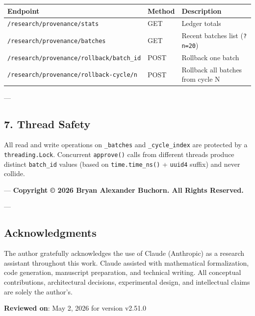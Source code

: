 \begin{center}
{\footnotesize
\begin{tabularx}{\columnwidth}{|>{\raggedright\arraybackslash}X|>{\raggedright\arraybackslash}X|>{\raggedright\arraybackslash}X|}
\hline
Endpoint & Method & Description \\ \hline
\texttt{/research/provenance/stats} & GET & Ledger totals \\ \hline
\texttt{/research/provenance/batches} & GET & Recent batches list (\texttt{?n=20}) \\ \hline
\texttt{/research/provenance/rollback/{batch\_id}} & POST & Rollback one batch \\ \hline
\texttt{/research/provenance/rollback-cycle/{n}} & POST & Rollback all batches from cycle N \\ \hline
\end{tabularx}
}
\end{center}

---

\subsection{7. Thread Safety}

All read and write operations on \texttt{\_batches} and \texttt{\_cycle\_index} are protected by a \texttt{threading.Lock}. Concurrent \texttt{approve()} calls from different threads produce distinct \texttt{batch\_id} values (based on \texttt{time.time\_ns()} + \texttt{uuid4} suffix) and never collide.

---
\textbf{Copyright © 2026 Bryan Alexander Buchorn. All Rights Reserved.}

---
\subsection{Acknow\-ledgments}

The author gratefully ackno\-wledges the use of Claude (Anthropic) as a research assistant throughout this work. Claude assisted with mathe\-matical forma\-lization, code generation, manuscript preparation, and technical writing. All conceptual contr\-ibutions, archi\-tectural decisions, exper\-imental design, and intel\-lectual claims are solely the author's.

\textbf{Reviewed on}: May 2, 2026 for version v2.51.0
